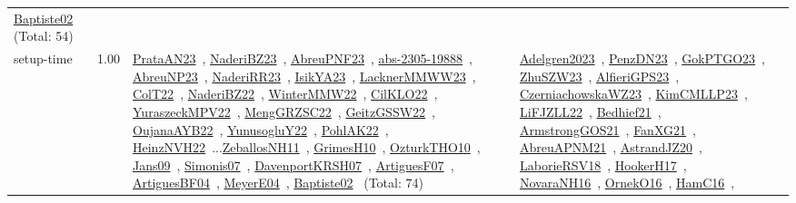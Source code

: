 {\begin{longtable}{p{3cm}r>{\raggedright\arraybackslash}p{6cm}>{\raggedright\arraybackslash}p{6cm}>{\raggedright\arraybackslash}p{8cm}}
\href{../works/Baptiste02.pdf}{Baptiste02}~\cite{Baptiste02} (Total: 54)\\
\index{setup-time}\index{Concepts!setup-time}setup-time &  1.00 & \href{../works/PrataAN23.pdf}{PrataAN23}~\cite{PrataAN23}, \href{../works/NaderiBZ23.pdf}{NaderiBZ23}~\cite{NaderiBZ23}, \href{../works/AbreuPNF23.pdf}{AbreuPNF23}~\cite{AbreuPNF23}, \href{../works/abs-2305-19888.pdf}{abs-2305-19888}~\cite{abs-2305-19888}, \href{../works/AbreuNP23.pdf}{AbreuNP23}~\cite{AbreuNP23}, \href{../works/NaderiRR23.pdf}{NaderiRR23}~\cite{NaderiRR23}, \href{../works/IsikYA23.pdf}{IsikYA23}~\cite{IsikYA23}, \href{../works/LacknerMMWW23.pdf}{LacknerMMWW23}~\cite{LacknerMMWW23}, \href{../works/ColT22.pdf}{ColT22}~\cite{ColT22}, \href{../works/NaderiBZ22.pdf}{NaderiBZ22}~\cite{NaderiBZ22}, \href{../works/WinterMMW22.pdf}{WinterMMW22}~\cite{WinterMMW22}, \href{../works/CilKLO22.pdf}{CilKLO22}~\cite{CilKLO22}, \href{../works/YuraszeckMPV22.pdf}{YuraszeckMPV22}~\cite{YuraszeckMPV22}, \href{../works/MengGRZSC22.pdf}{MengGRZSC22}~\cite{MengGRZSC22}, \href{../works/GeitzGSSW22.pdf}{GeitzGSSW22}~\cite{GeitzGSSW22}, \href{../works/OujanaAYB22.pdf}{OujanaAYB22}~\cite{OujanaAYB22}, \href{../works/YunusogluY22.pdf}{YunusogluY22}~\cite{YunusogluY22}, \href{../works/PohlAK22.pdf}{PohlAK22}~\cite{PohlAK22}, \href{../works/HeinzNVH22.pdf}{HeinzNVH22}~\cite{HeinzNVH22}...\href{../works/ZeballosNH11.pdf}{ZeballosNH11}~\cite{ZeballosNH11}, \href{../works/GrimesH10.pdf}{GrimesH10}~\cite{GrimesH10}, \href{../works/OzturkTHO10.pdf}{OzturkTHO10}~\cite{OzturkTHO10}, \href{../works/Jans09.pdf}{Jans09}~\cite{Jans09}, \href{../works/Simonis07.pdf}{Simonis07}~\cite{Simonis07}, \href{../works/DavenportKRSH07.pdf}{DavenportKRSH07}~\cite{DavenportKRSH07}, \href{../works/ArtiguesF07.pdf}{ArtiguesF07}~\cite{ArtiguesF07}, \href{../works/ArtiguesBF04.pdf}{ArtiguesBF04}~\cite{ArtiguesBF04}, \href{../works/MeyerE04.pdf}{MeyerE04}~\cite{MeyerE04}, \href{../works/Baptiste02.pdf}{Baptiste02}~\cite{Baptiste02} (Total: 74) & \href{../works/Adelgren2023.pdf}{Adelgren2023}~\cite{Adelgren2023}, \href{../works/PenzDN23.pdf}{PenzDN23}~\cite{PenzDN23}, \href{../works/GokPTGO23.pdf}{GokPTGO23}~\cite{GokPTGO23}, \href{../works/ZhuSZW23.pdf}{ZhuSZW23}~\cite{ZhuSZW23}, \href{../works/AlfieriGPS23.pdf}{AlfieriGPS23}~\cite{AlfieriGPS23}, \href{../works/CzerniachowskaWZ23.pdf}{CzerniachowskaWZ23}~\cite{CzerniachowskaWZ23}, \href{../works/KimCMLLP23.pdf}{KimCMLLP23}~\cite{KimCMLLP23}, \href{../works/LiFJZLL22.pdf}{LiFJZLL22}~\cite{LiFJZLL22}, \href{../works/Bedhief21.pdf}{Bedhief21}~\cite{Bedhief21}, \href{../works/ArmstrongGOS21.pdf}{ArmstrongGOS21}~\cite{ArmstrongGOS21}, \href{../works/FanXG21.pdf}{FanXG21}~\cite{FanXG21}, \href{../works/AbreuAPNM21.pdf}{AbreuAPNM21}~\cite{AbreuAPNM21}, \href{../works/AstrandJZ20.pdf}{AstrandJZ20}~\cite{AstrandJZ20}, \href{../works/LaborieRSV18.pdf}{LaborieRSV18}~\cite{LaborieRSV18}, \href{../works/HookerH17.pdf}{HookerH17}~\cite{HookerH17}, \href{../works/NovaraNH16.pdf}{NovaraNH16}~\cite{NovaraNH16}, \href{../works/OrnekO16.pdf}{OrnekO16}~\cite{OrnekO16}, \href{../works/HamC16.pdf}{HamC16}~\cite{HamC16}, 
\end{longtable}}
